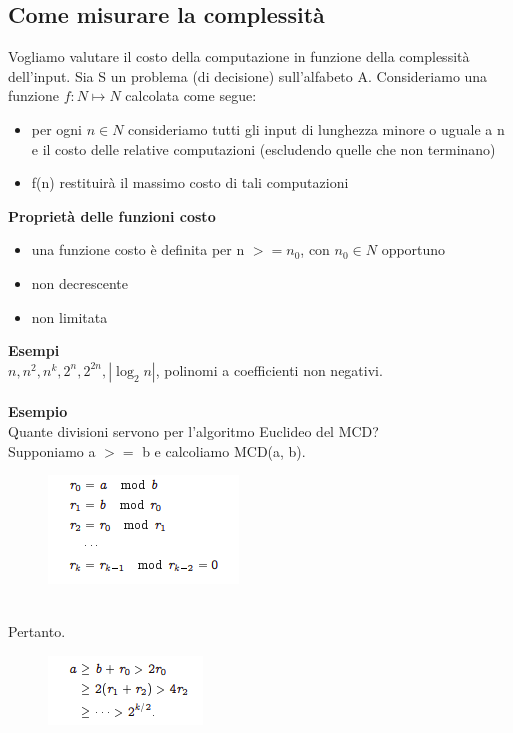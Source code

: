 \subsection{Come misurare la complessità}
Vogliamo valutare il costo della computazione in funzione della complessità dell’input.
Sia S un problema (di decisione) sull’alfabeto A. Consideriamo una funzione $f : N \mapsto N$ calcolata come segue:
\begin{itemize}
    \item per ogni $n \in N$ consideriamo tutti gli input di lunghezza minore o uguale a n e il costo delle relative computazioni (escludendo quelle che non terminano)
    
    \item f(n) restituirà il massimo costo di tali computazioni
\end{itemize}
\textbf{Proprietà delle funzioni costo}
\begin{itemize}
    \item una funzione costo è definita per n $>= n_0$, con $n_0 \in N$ opportuno
    
    \item non decrescente
    
    \item non limitata
\end{itemize}
\textbf{Esempi}\\
$n, n^2, n^k, 2^n, 2^{2n}, |\log_2 n|$, polinomi a coefficienti non negativi.\\\\
\newpage
\textbf{Esempio}\\
Quante divisioni servono per l’algoritmo Euclideo del MCD?\\
Supponiamo a $>=$ b e calcoliamo MCD(a, b).\\
\begin{figure}[htp]
    \centering
    \includegraphics[scale=0.9]{tesi_stile/img/f5cap9.png}
\end{figure}\\
Pertanto.
\begin{figure}[htp]
    \includegraphics[scale=0.9]{tesi_stile/img/f6cap9.png}
\end{figure}\\
